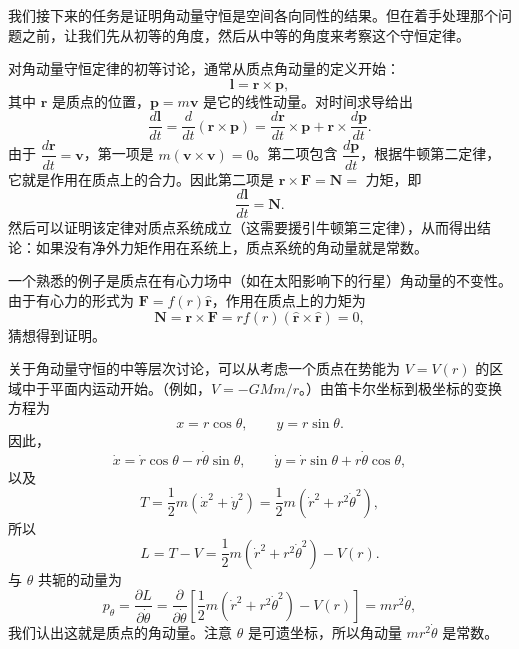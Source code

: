 我们接下来的任务是证明角动量守恒是空间各向同性的结果。但在着手处理那个问题之前，让我们先从初等的角度，然后从中等的角度来考察这个守恒定律。

对角动量守恒定律的初等讨论，通常从质点角动量的定义开始：
\begin{equation}\label{eq:1.l}
\mathbf{l} = \mathbf{r}\times\mathbf{p},
\end{equation}
其中 $\mathbf{r}$ 是质点的位置，$\mathbf{p} = m\mathbf{v}$ 是它的线性动量。对时间求导给出
\begin{equation}\label{eq:1.dl}
\frac{d\mathbf{l}}{dt} = \frac{d}{dt}(\mathbf{r}\times\mathbf{p}) = \frac{d\mathbf{r}}{dt}\times\mathbf{p} + \mathbf{r}\times\frac{d\mathbf{p}}{dt}.
\end{equation}
由于 $\dfrac{d\mathbf{r}}{dt} = \mathbf{v}$，第一项是 $m(\mathbf{v}\times\mathbf{v}) = 0$。第二项包含 $\dfrac{d\mathbf{p}}{dt}$，根据牛顿第二定律，它就是作用在质点上的合力。因此第二项是 $\mathbf{r}\times\mathbf{F} = \mathbf{N} = $ 力矩，即
\begin{equation}\label{eq:1.dl2}
\frac{d\mathbf{l}}{dt} = \mathbf{N}.
\end{equation}
然后可以证明该定律对质点系统成立（这需要援引牛顿第三定律），从而得出结论：如果没有净外力矩作用在系统上，质点系统的角动量就是常数。

一个熟悉的例子是质点在有心力场中（如在太阳影响下的行星）角动量的不变性。由于有心力的形式为 $\mathbf{F} = f(r)\hat{\mathbf{r}}$，作用在质点上的力矩为
\begin{equation}\label{eq:1.central}
\mathbf{N} = \mathbf{r}\times\mathbf{F} = rf(r)(\hat{\mathbf{r}}\times\hat{\mathbf{r}}) = 0,
\end{equation}
猜想得到证明。

关于角动量守恒的中等层次讨论，可以从考虑一个质点在势能为 $V = V(r)$ 的区域中于平面内运动开始。（例如，$V = -GMm/r$。）由笛卡尔坐标到极坐标的变换方程为
\begin{equation}\label{eq:1.polar}
x = r\cos\theta, \qquad y = r\sin\theta.
\end{equation}
因此，
\begin{equation*}
\dot{x} = \dot{r}\cos\theta - r\dot{\theta}\sin\theta, \qquad \dot{y} = \dot{r}\sin\theta + r\dot{\theta}\cos\theta,
\end{equation*}
以及
\begin{equation}\label{eq:1.Tpol}
T = \frac{1}{2}m\left(\dot{x}^2 + \dot{y}^2\right) = \frac{1}{2}m\left(\dot{r}^2 + r^2\dot{\theta}^2\right),
\end{equation}
所以
\begin{equation}\label{eq:1.Lpol}
L = T - V = \frac{1}{2}m\left(\dot{r}^2 + r^2\dot{\theta}^2\right) - V(r).
\end{equation}
与 $\theta$ 共轭的动量为
\begin{equation}\label{eq:1.ptheta}
p_\theta = \frac{\partial L}{\partial \dot{\theta}} = \frac{\partial}{\partial \dot{\theta}}\left[\frac{1}{2}m\left(\dot{r}^2 + r^2\dot{\theta}^2\right) - V(r)\right] = mr^2\dot{\theta},
\end{equation}
我们认出这就是质点的角动量。注意 $\theta$ 是可遗坐标，所以角动量 $mr^2\dot{\theta}$ 是常数。

